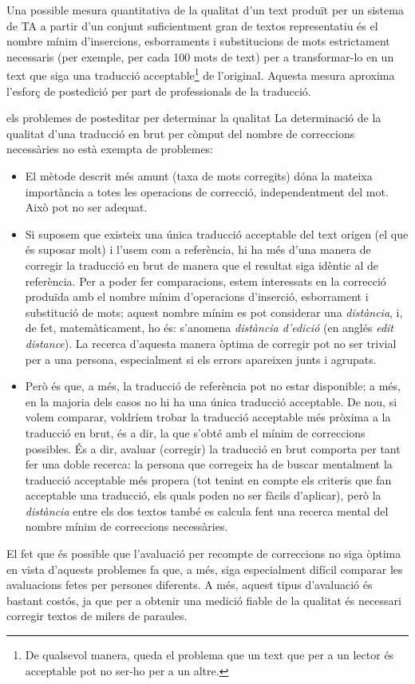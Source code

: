 \begin{enumerate}
\begin{enumerate}
  Una possible mesura quantitativa de la qualitat d'un text produït
  per un sistema de TA a partir d'un conjunt suficientment gran de
  textos representatiu és el nombre mínim d'insercions, esborraments i
  substitucions de mots estrictament necessaris (per exemple, per cada
  100 mots de text) per a transformar-lo en un text que siga una
  traducció acceptable\footnote{De qualsevol manera, queda el problema
    que un text que per a un lector és acceptable pot no ser-ho per a
    un altre.} de l'original. Aquesta mesura aproxima
  \cite[p.~264]{sager93b} l'esforç de postedició per part de
  professionals de la traducció.

\begin{persabermes}{els problemes de posteditar per determinar la qualitat}
  La determinació de la qualitat d'una traducció en brut per còmput
  del nombre de correccions necessàries no està exempta de problemes:
\begin{itemize}
\item El mètode descrit més amunt (taxa de mots corregits) dóna la
  mateixa importància a totes les operacions de correcció,
  independentment del mot. Això pot no ser adequat.
\item Si suposem que existeix una única traducció acceptable del text
  origen (el que és suposar molt) i l'usem com a referència, hi ha més
  d'una manera de corregir la traducció en brut de manera que el
  resultat siga idèntic al de referència. Per a poder fer
  comparacions, estem interessats en la correcció produïda amb el
  nombre mínim d'operacions d'inserció, esborrament i substitució de
  mots; aquest nombre mínim es pot considerar una \emph{distància}, i,
  de fet, matemàticament, ho és: s'anomena \emph{distància d'edició}
  (en anglés \emph{edit distance}). La recerca d'aquesta manera òptima
  de corregir pot no ser trivial per a una persona, especialment si
  els errors apareixen junts i agrupats.
\item Però és que, a més, la traducció de referència pot no estar
  disponible; a més, en la majoria dels casos no hi ha una única
  traducció acceptable. De nou, si volem comparar, voldríem trobar la
  traducció acceptable més pròxima a la traducció en brut, és a dir,
  la que s'obté amb el mínim de correccions possibles. És a dir,
  avaluar (corregir) la traducció en brut comporta per tant fer una
  doble recerca: la persona que corregeix ha de buscar mentalment la
  traducció acceptable més propera (tot tenint en compte els criteris
  que fan acceptable una traducció, els quals poden no ser fàcils
  d'aplicar), però la \emph{distància} entre els dos textos també es
  calcula fent una recerca mental del nombre mínim de correccions
  necessàries.
\end{itemize}
El fet que és possible que l'avaluació per recompte de correccions no
siga òptima en vista d'aquests problemes fa que, a més, siga
especialment difícil comparar les avaluacions fetes per persones
diferents. A més, aquest tipus d'avaluació és bastant costós, ja que
per a obtenir una medició fiable de la qualitat és necessari corregir
textos de milers de paraules.  


\end{persabermes}
\end{enumerate}
\end{enumerate}
